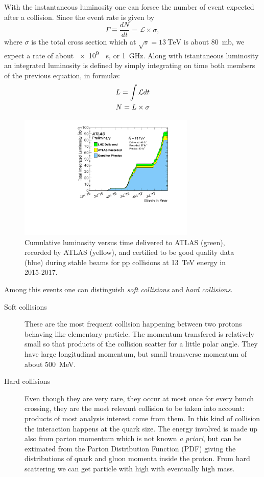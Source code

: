 With the instantaneous luminosity one can forsee the number of event expected after a collision. Since the event rate is given by 
\begin{equation}
\Gamma\equiv\frac{dN}{dt}=\mathcal{L}\times\sigma,
\end{equation}
where $\sigma$ is the total \pp cross section which at $\sqrt{s}=\SI{13}{\TeV}$ is about \SI{80}{mb}, we expect a rate of about \SI{e9}{\per\s}, or \SI{1}{\GHz}. Along with istantaneous luminosity an integrated luminosity is defined by simply integrating on time both members of the previous equation, in formul\ae:
\begin{gather}
	L=\int{\mathcal{L}dt} \notag\\
	N=L\times\sigma
\end{gather} 

\begin{figure}[tp]
	\centering
	\includegraphics[width=0.75\textwidth]{LHC_ATLAS/intlumivstimeRun2DQ.pdf}
	\caption{Cumulative luminosity versus time delivered to ATLAS (green), recorded by ATLAS (yellow), and certified to be good quality data (blue) during stable beams for pp collisions at \SI{13}{TeV} \cm energy in 2015-2017.}
\end{figure}

Among this events one can distinguish \emph{soft collisions} and \emph{hard collisions}.
\begin{description}
\item[Soft collisions] These are the most frequent collision happening between two protons behaving like elementary particle. The momentum transfered is relatively small so that products of the collision scatter for a little polar angle. They have large longitudinal \mbox{momentum}, but small transverse momentum \pt of about \SI{500}{\MeV}.
\item[Hard collisions] Even though they are very rare, they occur at most once for every bunch crossing, they are the most relevant collision to be taken into account: products of most analysis interest come from them. In this kind of collision the interaction happens at the quark size. The energy involved is made up also from parton momentum which is not known \emph{a priori}, but can be extimated from the Parton Distribution Function (PDF) giving the distributions of quark and gluon momenta inside the proton. From hard scattering we can get particle with high \pt with eventually high mass.
\end{description}

